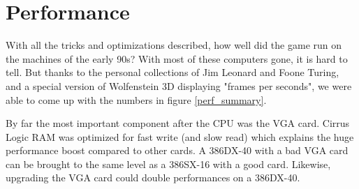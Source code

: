 \section{Performance}
With all the tricks and optimizations described, how well did the game run on the machines of the early 90s? With most of these computers gone, it is hard to tell. But thanks to the personal collections of Jim Leonard and Foone Turing, and a special version of Wolfenstein 3D displaying "frames per seconds", we were able to come up with the numbers in figure \ref{perf_summary}.\\
\par
By far the most important component after the CPU was the VGA card. Cirrus Logic RAM was optimized for fast write (and slow read) which explains the huge performance boost compared to other cards. A 386DX-40 with a bad VGA card can be brought to the same level as a 386SX-16 with a good card. Likewise, upgrading the VGA card could double performances on a 386DX-40.\\ 
\par

